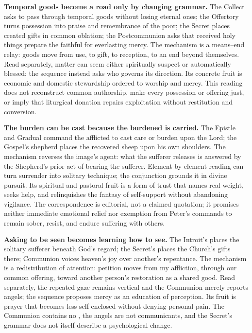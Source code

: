 \noindent\textbf{Temporal goods become a road only by changing grammar.\enspace{}}
The Collect asks to pass through temporal goods without losing eternal ones; the Offertory turns possession into praise and remembrance of the poor; the Secret places created gifts in common oblation; the Postcommunion asks that received holy things prepare the faithful for everlasting mercy. The mechanism is a means--end relay: goods move from use, to gift, to reception, to an end beyond themselves. Read separately, matter can seem either spiritually suspect or automatically blessed; the sequence instead asks who governs its direction. Its concrete fruit is economic and domestic stewardship ordered to worship and mercy. This reading does not reconstruct common authorship, make every possession or offering just, or imply that liturgical donation repairs exploitation without restitution and conversion.

\noindent\textbf{The burden can be cast because the burdened is carried.\enspace{}}
The Epistle and Gradual command the afflicted to cast care or burden upon the Lord; the Gospel's shepherd places the recovered sheep upon his own shoulders. The mechanism reverses the image's agent: what the sufferer releases is answered by the Shepherd's prior act of bearing the sufferer. Element-by-element reading can turn surrender into solitary technique; the conjunction grounds it in divine pursuit. Its spiritual and pastoral fruit is a form of trust that names real weight, seeks help, and relinquishes the fantasy of self-support without abandoning vigilance. The correspondence is editorial, not a claimed quotation; it promises neither immediate emotional relief nor exemption from Peter's commands to remain sober, resist, and endure suffering with others.

\noindent\textbf{Asking to be seen becomes learning how to see.\enspace{}}
The Introit's  places the solitary sufferer beneath God's regard; the Secret's  places the Church's gifts there; Communion voices heaven's joy over another's repentance. The mechanism is a redistribution of attention: petition moves from my affliction, through our common offering, toward another person's restoration as a shared good. Read separately, the repeated gaze remains vertical and the Communion merely reports angels; the sequence proposes mercy as an education of perception. Its fruit is prayer that becomes less self-enclosed without denying personal pain. The Communion contains no , the angels are not communicants, and the Secret's grammar does not itself describe a psychological change.

